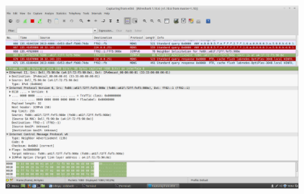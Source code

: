 \documentclass[12pt]{article}
\begin{document}
\begin{figure}[ht]
\centering
\includegraphics[scale=0.25]{neighboradvertisementquandoomatheuspegoumeuip.png}
\caption{}
\label{3adver}
\end{figure}
\end{document}
